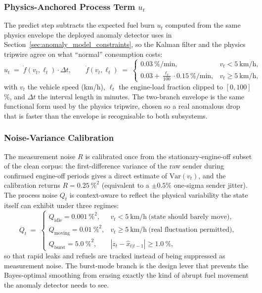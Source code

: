 \subsubsection{Physics-Anchored Process Term $u_t$}
\label{sec:kalman_process_term}

The predict step subtracts the expected fuel burn $u_t$ computed from the same physics envelope the deployed anomaly detector uses in Section~\ref{sec:anomaly_model_constraints}, so the Kalman filter and the physics tripwire agree on what ``normal'' consumption costs:
\begin{equation}
u_t \;=\; \dot{f}(v_t,\ell_t) \cdot \Delta t, \qquad
\dot{f}(v_t,\ell_t) \;=\; \begin{cases}
0.03\ \%/\text{min}, & v_t < 5~\text{km/h}, \\
0.03 + \frac{\ell_t}{100}\cdot 0.15\ \%/\text{min}, & v_t \geq 5~\text{km/h},
\end{cases}
\label{eq:kf-process-term-fuel}
\end{equation}
with $v_t$ the vehicle speed (km/h), $\ell_t$ the engine-load fraction clipped to $[0,100]$\%, and $\Delta t$ the interval length in minutes. The two-branch envelope is the same functional form used by the physics tripwire, chosen so a real anomalous drop that is faster than the envelope is recognisable to both subsystems.

\subsubsection{Noise-Variance Calibration}
\label{sec:kalman_noise_calibration}

The measurement noise $R$ is calibrated once from the stationary-engine-off subset of the clean corpus: the first-difference variance of the raw sender during confirmed engine-off periods gives a direct estimate of $\mathrm{Var}(v_t)$, and the calibration returns $R = 0.25~\%^{2}$ (equivalent to a $\pm 0.5\%$ one-sigma sender jitter). The process noise $Q_t$ is context-aware to reflect the physical variability the state itself can exhibit under three regimes:
\begin{equation}
Q_t \;=\; \begin{cases}
Q_{\mathrm{idle}}   = 0.001\ \%^{2}, & v_t < 5~\text{km/h} \ \text{(state should barely move)}, \\
Q_{\mathrm{moving}} = 0.01\ \%^{2},  & v_t \geq 5~\text{km/h} \ \text{(real fluctuation permitted)}, \\
Q_{\mathrm{burst}}  = 5.0\ \%^{2},   & |z_t - \hat{x}_{t|t-1}| \geq 1.0~\%,
\end{cases}
\label{eq:kf-q-schedule}
\end{equation}
so that rapid leaks and refuels are tracked instead of being suppressed as measurement noise. The burst-mode branch is the design lever that prevents the Bayes-optimal smoothing from erasing exactly the kind of abrupt fuel movement the anomaly detector needs to see.

